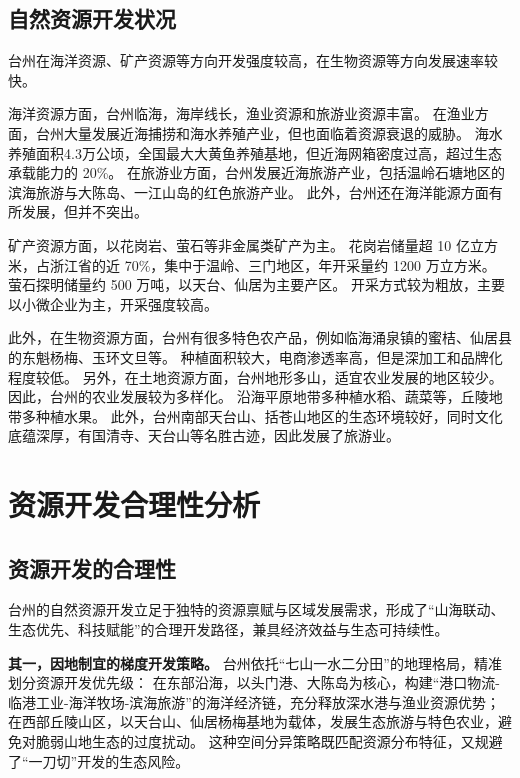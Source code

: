 \documentclass[11pt]{article}
\begin{document}
\subsection{自然资源开发状况}\label{subsec:resoure-develop}

台州在海洋资源、矿产资源等方向开发强度较高，在生物资源等方向发展速率较快。

海洋资源方面，台州临海，海岸线长，渔业资源和旅游业资源丰富。
在渔业方面，台州大量发展近海捕捞和海水养殖产业，但也面临着资源衰退的威胁。
海水养殖面积4.3万公顷，全国最大大黄鱼养殖基地，但近海网箱密度过高，超过生态承载能力的 20\%。
在旅游业方面，台州发展近海旅游产业，包括温岭石塘地区的滨海旅游与大陈岛、一江山岛的红色旅游产业。
此外，台州还在海洋能源方面有所发展，但并不突出。

矿产资源方面，以花岗岩、萤石等非金属类矿产为主。
花岗岩储量超 10 亿立方米，占浙江省的近 70\%，集中于温岭、三门地区，年开采量约 1200 万立方米。
萤石探明储量约 500 万吨，以天台、仙居为主要产区。
开采方式较为粗放，主要以小微企业为主，开采强度较高。

此外，在生物资源方面，台州有很多特色农产品，例如临海涌泉镇的蜜桔、仙居县的东魁杨梅、玉环文旦等。
种植面积较大，电商渗透率高，但是深加工和品牌化程度较低。
另外，在土地资源方面，台州地形多山，适宜农业发展的地区较少。
因此，台州的农业发展较为多样化。
沿海平原地带多种植水稻、蔬菜等，丘陵地带多种植水果。
此外，台州南部天台山、括苍山地区的生态环境较好，同时文化底蕴深厚，有国清寺、天台山等名胜古迹，因此发展了旅游业。

\section{资源开发合理性分析}\label{sec:analysis}

\subsection{资源开发的合理性}\label{subsec:resource-reasonable}

台州的自然资源开发立足于独特的资源禀赋与区域发展需求，形成了“山海联动、生态优先、科技赋能”的合理开发路径，兼具经济效益与生态可持续性。

\textbf{其一，因地制宜的梯度开发策略。}
台州依托“七山一水二分田”的地理格局，精准划分资源开发优先级：
在东部沿海，以头门港、大陈岛为核心，构建“港口物流-临港工业-海洋牧场-滨海旅游”的海洋经济链，充分释放深水港与渔业资源优势；
在西部丘陵山区，以天台山、仙居杨梅基地为载体，发展生态旅游与特色农业，避免对脆弱山地生态的过度扰动。
这种空间分异策略既匹配资源分布特征，又规避了“一刀切”开发的生态风险。
\end{document}
